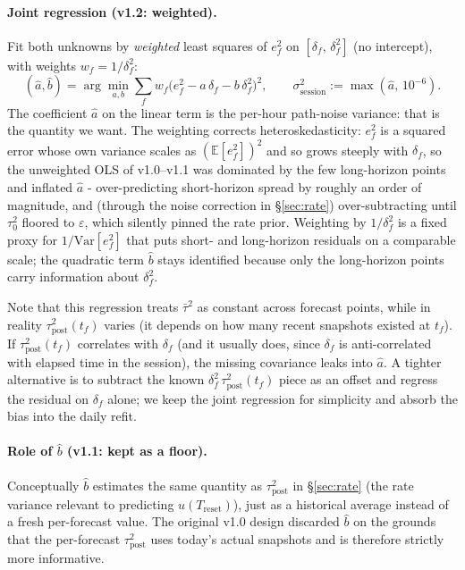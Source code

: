 \documentclass[11pt]{article}
\newcommand{\taupostsq}{\tau_{\text{post}}^2}
\newcommand{\tauzerosq}{\tau_0^2}
\newcommand{\sigsessionsq}{\sigma_{\text{session}}^2}
\newcommand{\Treset}{T_{\text{reset}}}
\begin{document}
\paragraph{Joint regression (v1.2: weighted).} Fit both unknowns by
\emph{weighted} least squares of $e_f^2$ on $[\delta_f,\, \delta_f^2]$ (no
intercept), with weights $w_f = 1/\delta_f^2$:
\[
  (\hat a, \hat b)
    = \arg\min_{a, b} \sum_f w_f\bigl(e_f^2 - a\,\delta_f - b\,\delta_f^2\bigr)^2,
  \qquad
  \sigsessionsq := \max(\hat a,\, 10^{-6}).
\]
The coefficient $\hat a$ on the linear term is the per-hour path-noise
variance: that is the quantity we want. The weighting corrects
heteroskedasticity: $e_f^2$ is a squared error whose own variance scales as
$(\mathbb{E}[e_f^2])^2$ and so grows steeply with $\delta_f$, so the unweighted
OLS of v1.0--v1.1 was dominated by the few long-horizon points and inflated
$\hat a$ - over-predicting short-horizon spread by roughly an order of
magnitude, and (through the noise correction in \S\ref{sec:rate})
over-subtracting until $\tauzerosq$ floored to $\varepsilon$, which silently
pinned the rate prior. Weighting by $1/\delta_f^2$ is a fixed proxy for
$1/\mathrm{Var}[e_f^2]$ that puts short- and long-horizon residuals on a
comparable scale; the quadratic term $\hat b$ stays identified because only the
long-horizon points carry information about $\delta_f^2$.

Note that this regression treats $\bar\tau^2$ as constant across forecast
points, while in reality $\taupostsq(t_f)$ varies (it depends on how many
recent snapshots existed at $t_f$). If $\taupostsq(t_f)$ correlates with
$\delta_f$ (and it usually does, since $\delta_f$ is anti-correlated with
elapsed time in the session), the missing covariance leaks into $\hat a$.
A tighter alternative is to subtract the known $\delta_f^2\,\taupostsq(t_f)$
piece as an offset and regress the residual on $\delta_f$ alone; we keep
the joint regression for simplicity and absorb the bias into the daily
refit.

\paragraph{Role of $\hat b$ (v1.1: kept as a floor).} Conceptually $\hat b$
estimates the same quantity as $\taupostsq$ in \S\ref{sec:rate} (the rate
variance relevant to predicting $u(\Treset)$), just as a historical average
instead of a fresh per-forecast value. The original v1.0 design discarded
$\hat b$ on the grounds that the per-forecast $\taupostsq$ uses today's
actual snapshots and is therefore strictly more informative.
\end{document}
